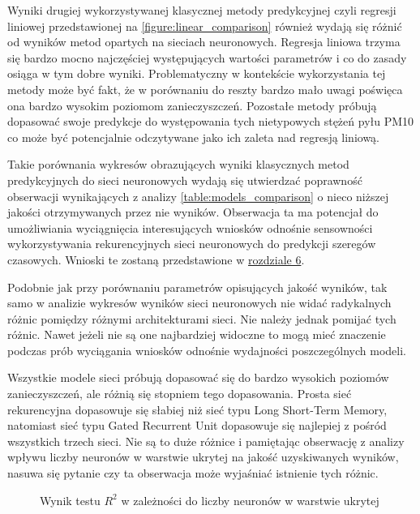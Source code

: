 \documentclass[10pt,a4paper]{article}
\begin{document}
Wyniki drugiej wykorzystywanej klasycznej metody predykcyjnej czyli regresji liniowej przedstawionej na \autoref{figure:linear_comparison} również wydają się różnić od wyników metod opartych na sieciach neuronowych. Regresja liniowa trzyma się bardzo mocno najczęściej występujących wartości parametrów i co do zasady osiąga w tym dobre wyniki. Problematyczny w kontekście wykorzystania tej metody może być fakt, że w porównaniu do reszty bardzo mało uwagi poświęca ona bardzo wysokim poziomom zanieczyszczeń. Pozostałe metody próbują dopasować swoje predykcje do występowania tych nietypowych stężeń pyłu PM10 co może być potencjalnie odczytywane jako ich zaleta nad regresją liniową. 

Takie porównania wykresów obrazujących wyniki klasycznych metod predykcyjnych do sieci neuronowych wydają się utwierdzać poprawność obserwacji wynikających z analizy \autoref{table:models_comparison} o nieco niższej jakości otrzymywanych przez nie wyników. Obserwacja ta ma potencjał do umożliwiania wyciągnięcia interesujących wniosków odnośnie sensowności wykorzystywania rekurencyjnych sieci neuronowych do predykcji szeregów czasowych. Wnioski te zostaną przedstawione w \hyperlink{section.6}{rozdziale 6}.

Podobnie jak przy porównaniu parametrów opisujących jakość wyników, tak samo w analizie wykresów wyników sieci neuronowych nie widać radykalnych różnic pomiędzy różnymi architekturami sieci. Nie należy jednak pomijać tych różnic. Nawet jeżeli nie są one najbardziej widoczne to mogą mieć znaczenie podczas prób wyciągania wniosków odnośnie wydajności poszczególnych modeli. 

Wszystkie modele sieci próbują dopasować się do bardzo wysokich poziomów zanieczyszczeń, ale różnią się stopniem tego dopasowania. Prosta sieć rekurencyjna dopasowuje się słabiej niż sieć typu Long Short-Term Memory, natomiast sieć typu Gated Recurrent Unit dopasowuje się najlepiej z pośród wszystkich trzech sieci. Nie są to duże różnice i pamiętając obserwację z analizy wpływu liczby neuronów w warstwie ukrytej na jakość uzyskiwanych wyników, nasuwa się pytanie czy ta obserwacja może wyjaśniać istnienie tych różnic.

\begin{figure}[!ht]
	\centering
	\caption{Wynik testu $R^2$ w zależności do liczby neuronów w warstwie ukrytej}
	\label{figure:neurons_comparison}
\end{figure}
\FloatBarrier
\end{document}
